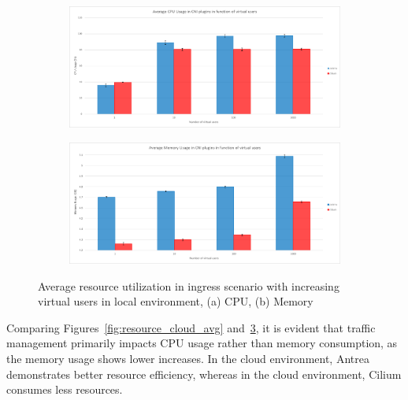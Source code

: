 \begin{figure}[H]
    \centering
    \begin{subfigure}[b]{0.8\textwidth}
        \includegraphics[width=\textwidth]{plots/traffic-splitting/cpu_local.png}
        \caption{}
        \label{fig:cpu_local_avg}
    \end{subfigure}
    \begin{subfigure}[b]{0.8\textwidth}
        \includegraphics[width=\textwidth]{plots/traffic-splitting/memory_local.png}
        \caption{}
        \label{fig:memory_local_avg}
    \end{subfigure}
    
    \caption{Average resource utilization in ingress scenario with increasing virtual users in local environment, (a) CPU, (b) Memory}
    \label{fig:resource_local_avg}
\end{figure}

Comparing Figures~\ref{fig:resource_cloud_avg} and~\ref{fig:resource_local_avg}, it is evident that traffic management primarily impacts CPU usage rather than memory consumption, as the memory usage shows lower increases. In the cloud environment, Antrea demonstrates better resource efficiency, whereas in the cloud environment, Cilium consumes less resources.


